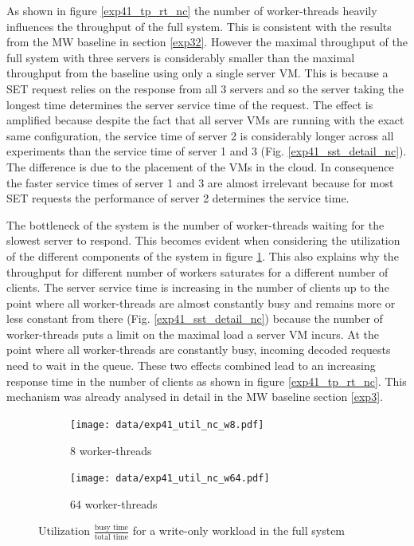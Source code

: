 \documentclass[report.tex]{subfiles}
\begin{document}
As shown in figure \ref{exp41_tp_rt_nc} the number of worker-threads heavily influences the throughput of the full system. This is consistent with the results from the MW baseline in section \ref{exp32}.
However the maximal throughput of the full system with three servers is considerably smaller than the maximal throughput from the baseline using only a single server VM. This is because a SET request relies on the response from all 3 servers and so the server taking the longest time determines the server service time of the request.
The effect is amplified because despite the fact that all server VMs are running with the exact same configuration, the service time of server 2 is considerably longer across all experiments than the service time of server 1 and 3 (Fig. \ref{exp41_sst_detail_nc}). The difference is due to the placement of the VMs in the cloud. 
In consequence the faster service times of server 1 and 3 are almost irrelevant because for most SET requests the performance of server 2 determines the service time. 

The bottleneck of the system is the number of worker-threads waiting for the slowest server to respond.
This becomes evident when considering the utilization of the different components of the system in figure \ref{exp41_util_nc}. This also explains why the throughput for different number of workers saturates for a different number of clients.
The server service time is increasing in the number of clients up to the point where all worker-threads are almost constantly busy and remains more or less constant from there (Fig. \ref{exp41_sst_detail_nc}) because the number of worker-threads puts a limit on the maximal load a server VM incurs. At the point where all worker-threads are constantly busy, incoming decoded requests need to wait in the queue. These two effects combined lead to an increasing response time in the number of clients as shown in figure \ref{exp41_tp_rt_nc}. This mechanism was already analysed in detail in the MW baseline section \ref{exp3}.


\begin{figure}[H]
	\begin{subfigure}[b]{.49\linewidth}
		\centering
		\texttt{[image: data/exp41\_util\_nc\_w8.pdf]}
		\caption{8 worker-threads}
	\end{subfigure}\hfill
	\begin{subfigure}[b]{.49\linewidth}
		\centering
		\texttt{[image: data/exp41\_util\_nc\_w64.pdf]}
		\caption{64 worker-threads}
	\end{subfigure}%
	\caption{Utilization $\frac{\text{busy time}}{\text{total time}}$ for a write-only workload in the full system}\label{exp41_util_nc}
\end{figure}
\end{document}
